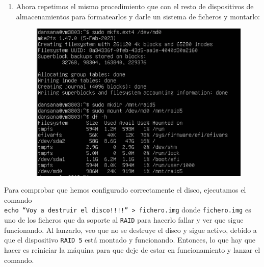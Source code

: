 \documentclass[10pt]{article}
\begin{document}
\begin{enumerate}
\begin{figure}[H]
		\end{figure}
		\item Ahora repetimos el mismo procedimiento que con el resto de dispositivos de almacenamientos para formatearlos y darle un sistema de ficheros y montarlo:
		\begin{figure}[H]
			\setlength{\abovecaptionskip}{0cm}
			\setlength{\belowcaptionskip}{0cm}
			\centering
			\includegraphics[width=0.6\linewidth]{Recursos/mountRAID.png}
		\end{figure}
	\end{enumerate}
	Para comprobar que hemos configurado correctamente el disco, ejecutamos el comando \\ \verb|echo “Voy a destruir el disco!!!!” > fichero.img| donde \verb|fichero.img| es uno de los ficheros que da soporte al \verb|RAID| para hacerlo fallar y ver que sigue funcionando. Al lanzarlo, veo que no se destruye el disco y sigue activo, debido a que el dispositivo \verb|RAID 5| está montado y funcionando. Entonces, lo que hay que hacer es reiniciar la máquina para que deje de estar en funcionamiento y lanzar el comando. 
	
\end{document}

